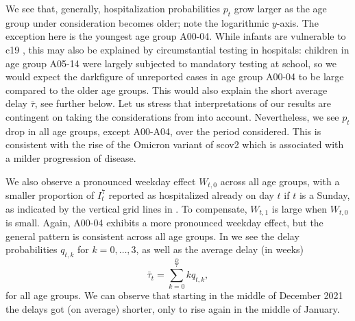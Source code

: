 We see that, generally, hospitalization probabilities $p_{t}$ grow larger as the age group under consideration becomes older; note the logarithmic $y$-axis. The exception here is the youngest age group A00-04. While infants are vulnerable to \gls{c19} \citep{Havers2024COVID19Associateda}, this may also be explained by circumstantial testing in hospitals: children in age group A05-14 were largely  subjected to mandatory testing at school, so we would expect the darkfigure of unreported cases in age group A00-04 to be large compared to the older age groups. This would also explain the short average delay $\bar \tau$, see further below. Let us stress that interpretations of our results are contingent on taking the considerations from  into account. 
Nevertheless, we see $p_{t}$ drop in all age groups, except A00-A04, over the period considered. This is consistent with the rise of the Omicron variant of \gls{scov2} \citep{RobertKoch-Institut2024SARSCoV2b} which is associated with a milder progression of disease. 

We also observe a pronounced weekday effect $W_{t,0}$ across all age groups, with a smaller proportion of $I^{7}_{t}$ reported as hospitalized already on day $t$ if $t$ is a Sunday, as indicated by the vertical grid lines in . To compensate, $W_{t,1}$ is large when $W_{t,0}$ is small. Again, A00-04 exhibits a more pronounced weekday effect, but the general pattern is consistent across all age groups. 
In  we see the delay probabilities $q_{t,k}$ for $k=0, \dots, 3$, as well as the average delay (in weeks)
$$
    \bar \tau_{t} = \sum_{k = 0}^{\frac{D}{7}} k q_{t,k},
$$
for all age groups. We can observe that starting in the middle of December 2021 the delays got (on average) shorter, only to rise again in the middle of January. 

\begin{table}
    \centering
    
    \caption{Efficiency factors (in \%) and weeks of delay for the seven models (one per age group) presented in this section. For younger age groups, there are few long delays, which causes numerical instabilities due to the consecutive conditional probability parametrization chosen in this section. For each of the age groups, we chose the longest delays that still acceptable for a reasonable fit, with a maximum delay of $8$ weeks. While the efficiency factor for A15-34 is quite low, we use an adequate number of samples for the prediction of states and signals, so the \gls{ess} is still sufficiently large.}
    \label{tab:hospitalization_showcase_ess}
\end{table}

